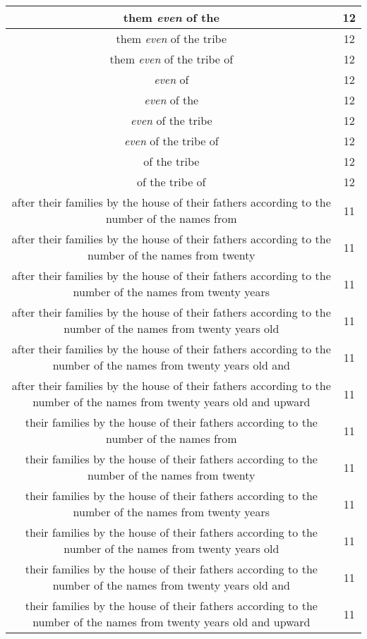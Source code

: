 \begin{center}
\begin{longtable}{|c|c|}
them \emph{even} of the & 12\\ \hline 
them \emph{even} of the tribe & 12\\ \hline 
them \emph{even} of the tribe of & 12\\ \hline 
\emph{even} of & 12\\ \hline 
\emph{even} of the & 12\\ \hline 
\emph{even} of the tribe & 12\\ \hline 
\emph{even} of the tribe of & 12\\ \hline 
of the tribe & 12\\ \hline 
of the tribe of & 12\\ \hline 
after their families by the house of their fathers according to the number of the names from & 11\\ \hline 
after their families by the house of their fathers according to the number of the names from twenty & 11\\ \hline 
after their families by the house of their fathers according to the number of the names from twenty years & 11\\ \hline 
after their families by the house of their fathers according to the number of the names from twenty years old & 11\\ \hline 
after their families by the house of their fathers according to the number of the names from twenty years old and & 11\\ \hline 
after their families by the house of their fathers according to the number of the names from twenty years old and upward & 11\\ \hline 
their families by the house of their fathers according to the number of the names from & 11\\ \hline 
their families by the house of their fathers according to the number of the names from twenty & 11\\ \hline 
their families by the house of their fathers according to the number of the names from twenty years & 11\\ \hline 
their families by the house of their fathers according to the number of the names from twenty years old & 11\\ \hline 
their families by the house of their fathers according to the number of the names from twenty years old and & 11\\ \hline 
their families by the house of their fathers according to the number of the names from twenty years old and upward & 11\\ \hline 

\end{longtable}
\end{center}
